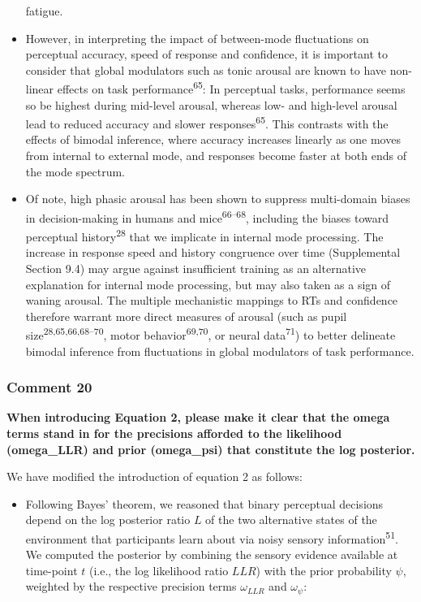 \documentclass[
]{article}
\providecommand{\tightlist}{%
  \setlength{\itemsep}{0pt}\setlength{\parskip}{0pt}}
\begin{document}
\begin{itemize}
  fatigue.
\item
  However, in interpreting the impact of between-mode fluctuations on
  perceptual accuracy, speed of response and confidence, it is important
  to consider that global modulators such as tonic arousal are known to
  have non-linear effects on task performance\textsuperscript{65}: In
  perceptual tasks, performance seems so be highest during mid-level
  arousal, whereas low- and high-level arousal lead to reduced accuracy
  and slower responses\textsuperscript{65}. This contrasts with the
  effects of bimodal inference, where accuracy increases linearly as one
  moves from internal to external mode, and responses become faster at
  both ends of the mode spectrum.
\item
  Of note, high phasic arousal has been shown to suppress multi-domain
  biases in decision-making in humans and mice\textsuperscript{66--68},
  including the biases toward perceptual history\textsuperscript{28}
  that we implicate in internal mode processing. The increase in
  response speed and history congruence over time (Supplemental Section
  9.4) may argue against insufficient training as an alternative
  explanation for internal mode processing, but may also taken as a sign
  of waning arousal. The multiple mechanistic mappings to RTs and
  confidence therefore warrant more direct measures of arousal (such as
  pupil size\textsuperscript{28,65,66,68--70}, motor
  behavior\textsuperscript{69,70}, or neural data\textsuperscript{71})
  to better delineate bimodal inference from fluctuations in global
  modulators of task performance.
\end{itemize}

\hypertarget{comment-20}{%
\subsubsection{Comment 20}\label{comment-20}}

\textbf{When introducing Equation 2, please make it clear that the omega
terms stand in for the precisions afforded to the likelihood
(omega\_LLR) and prior (omega\_psi) that constitute the log posterior.}

We have modified the introduction of equation 2 as follows:

\begin{itemize}
\tightlist
\item
  Following Bayes' theorem, we reasoned that binary perceptual decisions
  depend on the log posterior ratio \(L\) of the two alternative states
  of the environment that participants learn about via noisy sensory
  information\textsuperscript{51}. We computed the posterior by
  combining the sensory evidence available at time-point \(t\) (i.e.,
  the log likelihood ratio \(LLR\)) with the prior probability \(\psi\),
  weighted by the respective precision terms \(\omega_{LLR}\) and
  \(\omega_{\psi}\):
\end{itemize}
\end{document}
